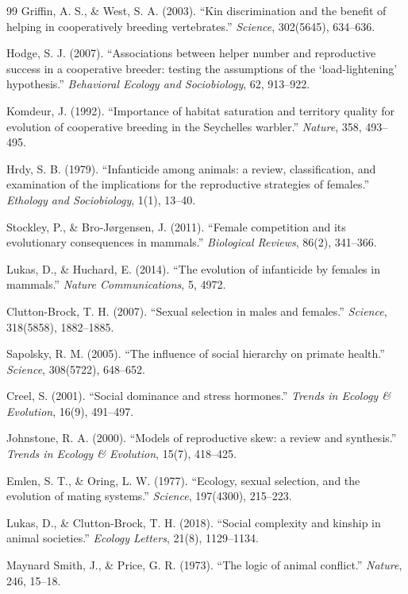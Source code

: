 \begin{thebibliography}{99}
Griffin, A. S., \& West, S. A. (2003).
``Kin discrimination and the benefit of helping in cooperatively breeding vertebrates.''
\textit{Science}, 302(5645), 634–636.

Hodge, S. J. (2007).
``Associations between helper number and reproductive success in a cooperative breeder: testing the assumptions of the ‘load-lightening’ hypothesis.''
\textit{Behavioral Ecology and Sociobiology}, 62, 913–922.

Komdeur, J. (1992).
``Importance of habitat saturation and territory quality for evolution of cooperative breeding in the Seychelles warbler.''
\textit{Nature}, 358, 493–495.

Hrdy, S. B. (1979).
``Infanticide among animals: a review, classification, and examination of the implications for the reproductive strategies of females.''
\textit{Ethology and Sociobiology}, 1(1), 13–40.

Stockley, P., \& Bro‐Jørgensen, J. (2011).
``Female competition and its evolutionary consequences in mammals.''
\textit{Biological Reviews}, 86(2), 341–366.

Lukas, D., \& Huchard, E. (2014).
``The evolution of infanticide by females in mammals.''
\textit{Nature Communications}, 5, 4972.


Clutton-Brock, T. H. (2007).
``Sexual selection in males and females.'' 
\textit{Science}, 318(5858), 1882–1885.

Sapolsky, R. M. (2005).
``The influence of social hierarchy on primate health.''
\textit{Science}, 308(5722), 648–652.

Creel, S. (2001).
``Social dominance and stress hormones.''
\textit{Trends in Ecology \& Evolution}, 16(9), 491–497.

Johnstone, R. A. (2000).
``Models of reproductive skew: a review and synthesis.''
\textit{Trends in Ecology \& Evolution}, 15(7), 418–425.


Emlen, S. T., \& Oring, L. W. (1977).
``Ecology, sexual selection, and the evolution of mating systems.''
\textit{Science}, 197(4300), 215–223.

Lukas, D., \& Clutton-Brock, T. H. (2018).
``Social complexity and kinship in animal societies.''
\textit{Ecology Letters}, 21(8), 1129–1134.


Maynard Smith, J., \& Price, G. R. (1973).
``The logic of animal conflict.''
\textit{Nature}, 246, 15–18.


\end{thebibliography}
